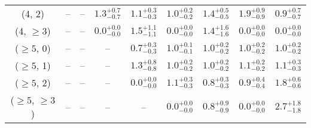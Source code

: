 \begin{table}[h!]
{\begin{tabular}{ccccccccc}
	(4, 2) & -- & -- & $1.3^{+ 0.7 }_{- 0.7 }$ & $1.1^{+ 0.3 }_{- 0.3 }$ & $1.0^{+ 0.2 }_{- 0.2 }$ & $1.4^{+ 0.5 }_{- 0.5 }$ & $1.9^{+ 0.9 }_{- 0.9 }$ & $0.9^{+ 0.7 }_{- 0.7 }$ \\[0.5ex] 
	(4, $\ge3$) & -- & -- & $0.0^{+ 0.0 }_{- 0.0 }$ & $1.5^{+ 1.1 }_{- 1.1 }$ & $0.0^{+ 0.0 }_{- 0.0 }$ & $1.4^{+ 1.6 }_{- 1.6 }$ & $0.0^{+ 0.0 }_{- 0.0 }$ & $0.0^{+ 0.0 }_{- 0.0 }$ \\[0.5ex] 
	($\ge5$, 0) & -- & -- & -- & $0.7^{+ 0.3 }_{- 0.3 }$ & $1.0^{+ 0.1 }_{- 0.1 }$ & $1.0^{+ 0.2 }_{- 0.2 }$ & $1.0^{+ 0.2 }_{- 0.2 }$ & $1.0^{+ 0.2 }_{- 0.2 }$ \\[0.5ex] 
	($\ge5$, 1) & -- & -- & -- & $1.3^{+ 0.8 }_{- 0.8 }$ & $1.0^{+ 0.2 }_{- 0.2 }$ & $1.0^{+ 0.2 }_{- 0.2 }$ & $1.1^{+ 0.2 }_{- 0.2 }$ & $1.1^{+ 0.3 }_{- 0.3 }$ \\[0.5ex] 
	($\ge5$, 2) & -- & -- & -- & $0.0^{+ 0.0 }_{- 0.0 }$ & $1.1^{+ 0.3 }_{- 0.3 }$ & $0.8^{+ 0.3 }_{- 0.3 }$ & $0.9^{+ 0.4 }_{- 0.4 }$ & $1.8^{+ 0.6 }_{- 0.6 }$ \\[0.5ex] 
	($\ge5$, $\ge3$) & -- & -- & -- & -- & $0.0^{+ 0.0 }_{- 0.0 }$ & $0.8^{+ 0.9 }_{- 0.9 }$ & $0.0^{+ 0.0 }_{- 0.0 }$ & $2.7^{+ 1.8 }_{- 1.8 }$ \\[0.5ex] 
	\hline
	\hline
\end{tabular}}
\end{table}
